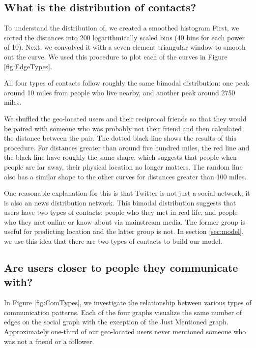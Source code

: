\documentclass{sig-alternate}
\begin{document}
\subsection{What is the distribution of contacts?}
To understand the distribution of, we created a smoothed histogram 
First, we sorted the distances into 200 logarithmically scaled bins (40 bins for each power of 10). Next, we convolved it with a seven element triangular window to smooth out the curve.
We used this procedure to plot each of the curves in Figure \ref{fig:EdgeTypes}.

All four types of contacts follow roughly the same bimodal distribution:
one peak around 10 miles from people who live nearby, and another peak around
2750 miles.

We shuffled the geo-located users and their reciprocal friends so that they
would be paired with someone who was probably not their friend and then
calculated the distance between the pair.
The dotted black line
shows the results of this procedure. For distances greater than around five
hundred miles, the red line and the black line have roughly the same shape,
which suggests that people when people are far away, their physical location no
longer matters.
The random line also has a similar shape to the other curves for distances
greater than 100 miles.

One reasonable explanation for this is that Twitter is not just a social
network; it is also an news distribution network.  This bimodal distribution
suggests that users have two types of contacts: people who they met in
real life, and people who they met online or know about via mainstream media.
The former group is useful for predicting location and the latter group is not.
In section \ref{sec:model}, we use this idea that there are two types of
contacts to build our model.

\subsection{Are users closer to people they communicate with?}
\begin{figure*}
\centering
{}
\caption{
CDF of the distance between a geo-located user and various types of contacts piloted on a logarithmic scale.
In these graphs, "I" refers to the geo-located user. "You" refers to their contact. 
}
\label{fig:ComTypes}
\end{figure*}
In Figure \ref{fig:ComTypes}, we investigate the relationship between various 
types of communication patterns.
Each of the four graphs visualize the same number of edges on the social graph with the exception of the Just Mentioned graph. Approximately one-third of our geo-located users never mentioned someone who was not a friend or a follower.
\end{document}
